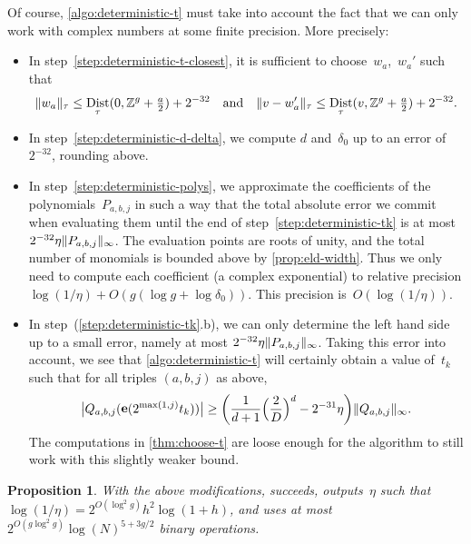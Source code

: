 \documentclass[12pt,oneside]{amsart}
\numberwithin{equation}{section}
\newtheorem{prop}[equation]{Proposition}
\theoremstyle{definition}
\newcommand{\Z}{\mathbb{Z}}
\DeclareMathOperator{\Dist}{Dist}
\DeclareMathOperator{\e}{\mathbf{e}}
\DeclarePairedDelimiter{\abs}{|}{|}
\DeclarePairedDelimiter{\paren}{(}{)}
\DeclarePairedDelimiter{\norm}{\|}{\|}
\begin{document}
Of course, \cref{algo:deterministic-t} must take into account the fact that we
can only work with complex numbers at some finite precision. More precisely:
\begin{itemize}
\item In step~\eqref{step:deterministic-t-closest}, it is sufficient to
  choose~$w_a$,~$w_a'$ such that
  \begin{displaymath}
    \norm{w_a}_\tau \leq \Dist_\tau(0, \Z^g + \tfrac a2) + 2^{-32} \quad\text{and}\quad
    \norm{v - w'_a}_\tau \leq \Dist_\tau(v, \Z^g + \tfrac a2) + 2^{-32}.
  \end{displaymath}
\item In step~\eqref{step:deterministic-d-delta}, we compute $d$
  and~$\delta_0$ up to an error of~$2^{-32}$, rounding above.
\item In step~\eqref{step:deterministic-polys}, we approximate the coefficients
  of the polynomials~$P_{a,b,j}$ in such a way that the total absolute error we
  commit when evaluating them until the end of
  step~\eqref{step:deterministic-tk} is at
  most~$ 2^{-32} \eta\norm{P_{a,b,j}}_\infty$. The evaluation points are roots
  of unity, and the total number of monomials is bounded above by
  \cref{prop:eld-width}. Thus we only need to compute each coefficient (a
  complex exponential) to relative precision
  $\log(1/\eta) + O(g(\log g + \log\delta_0))$. This precision
  is~$O(\log(1/\eta))$.
\item In step~(\ref{step:deterministic-tk}.b), we can only determine the left
  hand side up to a small error, namely at most
  $2^{-32} \eta\norm{P_{a,b,j}}_\infty$. Taking this error into account, we see
  that \cref{algo:deterministic-t} will certainly obtain a value of~$t_k$ such
  that for all triples $(a,b,j)$ as above,
  \begin{displaymath}
    \abs[\big]{Q_{a,b,j}(\e(2^{\max(1,j)}t_k))}
    \geq \paren[\bigg]{\frac{1}{d+1} \paren[\Big]{\frac 2D}^{d} - 2^{-31}\eta} \norm{Q_{a,b,j}}_\infty.
  \end{displaymath}
  The computations in \cref{thm:choose-t} are loose enough for the algorithm to
  still work with this slightly weaker bound.
\end{itemize}


\begin{prop}
  \label{prop:setup-cost} With the above modifications,
   succeeds, outputs~$\eta$ such
  that~$\log(1/\eta) = 2^{O(\log^2 g)} h^2\log(1+h)$, and uses at most
  $2^{O(g\log^2 g)} \log(N)^{5 + 3g/2}$ binary operations.
\end{prop}
\end{document}
